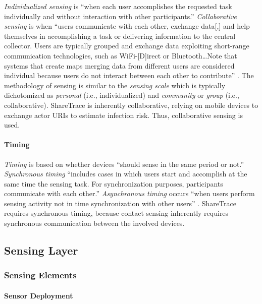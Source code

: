 \emph{Individualized sensing} is ``when each user accomplishes the requested task individually and without interaction with other participants.'' \emph{Collaborative sensing} is when ``users communicate with each other, exchange data[,] and help themselves in accomplishing a task or delivering information to the central collector. Users are typically grouped and exchange data exploiting short-range communication technologies, such as WiFi-[D]irect or Bluetooth{\ldots}Note that systems that create maps merging data from different users are considered individual because users do not interact between each other to contribute'' \citep{Capponi2019}. The methodology of sensing is similar to the \emph{sensing scale} which is typically dichotomized as \emph{personal} \citep{Lane2010, Ganti2011} (i.e., individualized) and \emph{community} \citep{Ganti2011} or \emph{group} \citep{Lane2010} (i.e., collaborative). ShareTrace is inherently collaborative, relying on mobile devices to exchange actor URIs to estimate infection risk. Thus, collaborative sensing is used.

\paragraph{Timing}

\emph{Timing} is based on whether devices ``should sense in the same period or not.'' \emph{Synchronous timing} ``includes cases in which users start and accomplish at the same time the sensing task. For synchronization purposes, participants communicate with each other.'' \emph{Asynchronous timing} occurs ``when users perform sensing activity not in time synchronization with other users'' \citep{Capponi2019}. ShareTrace requires synchronous timing, because contact sensing inherently requires synchronous communication between the involved devices.

\subsection{Sensing Layer}

\subsubsection{Sensing Elements}

\paragraph{Sensor Deployment}

